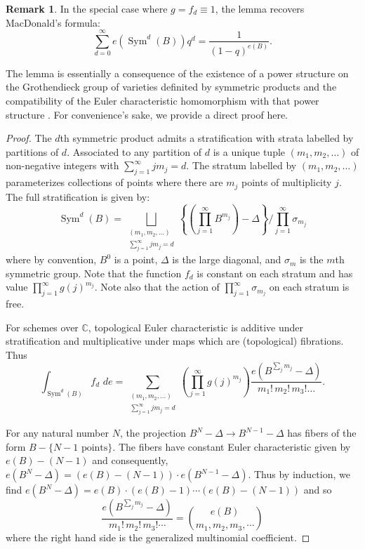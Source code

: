 \documentclass{amsart}
\theoremstyle{definition}
\newtheorem{remark}[theorem]{Remark}
\newcommand{\CC} {\mathbb{C}}          %
\newcommand{\Sym}{\operatorname{Sym}}
\begin{document}
\begin{remark} \label{MacD}
In the special case where $g=f_{d}\equiv  1$, the lemma recovers
MacDonald's formula: $$\sum _{d=0}^{\infty }e (\Sym ^{d} (B)) q^{d} =
\frac{1}{(1-q)^{e (B)}}.$$ 

The lemma is essentially a consequence of the existence of a power
structure on the Grothendieck group of varieties definited by
symmetric products and the compatibility of the Euler characteristic
homomorphism with that power structure  \cite{}. For convenience's
sake, we provide a direct proof here.
\end{remark}
\begin{proof}
The $d$th symmetric product admits a stratification with strata
labelled by partitions of $d$. Associated to any partition of $d$ is a
unique tuple $(m_{1},m_{2},\dots )$ of non-negative integers with
$\sum _{j=1}^{\infty }j m_{j}=d$. The stratum labelled by
$(m_{1},m_{2},\dots )$ parameterizes collections of points where there
are $m_{j}$ points of multiplicity $j$. The full stratification is
given by:
\[
\Sym ^{d} (B) = \bigsqcup_{\begin{smallmatrix} (m_{1},m_{2},\dots )\\
\sum _{j=1}^{\infty }j m_{j}=d  \end{smallmatrix}} \left\{\left(\prod _{j=1}^{\infty }B^{m_{j}} \right) -\Delta  \right\}/ \prod _{j=1}^{\infty }\sigma _{m_{j}} 
\]
where by convention, $B^{0}$ is a point, $\Delta $ is the large
diagonal, and $\sigma _{m}$ is the $m$th symmetric group. Note that
the function $f_{d}$ is constant on each stratum and has value $\prod
_{j=1}^{\infty }g (j)^{m_{j}}$. Note also that the action of $\prod
_{j=1}^{\infty }\sigma _{m_{j}}$ on each stratum is free. 

For schemes over $\CC $, topological Euler characteristic is additive
under stratification and multiplicative under maps which are
(topological) fibrations. Thus
\[
\int _{\Sym ^{d} (B)} f_{d}\,\, de = \sum _{\begin{smallmatrix}(m_{1},m_{2},\dots )\\
\sum _{j=1}^{\infty }j m_{j}=d   \end{smallmatrix}} \left(\prod _{j=1}^{\infty } g (j)^{m_{j}} \right) \frac{e (B^{\sum _{j}m_{j}}-\Delta )}{m_{1}!\, m_{2}!\, m_{3}!\dots }.
\]

For any natural number $N$, the projection $B^{N}-\Delta \to
B^{N-1}-\Delta $ has fibers of the form $B-\{N-1\text{ points}
\}$. The fibers have constant Euler characteristic given by $e (B)-
(N-1)$ and consequently, $e (B^{N}-\Delta )= (e (B)- (N-1))\cdot e
(B^{N-1}-\Delta )$. Thus by induction, we find $e (B^{N}-\Delta ) = e
(B)\cdot (e (B)-1)\cdots (e (B)- (N-1))$ and so 
\[
\frac{e (B^{\sum _{j}m_{j}}-\Delta )}{m_{1}!\,m_{2}!\,m_{3}!\cdots } = \binom{e (B)}{m_{1},m_{2},m_{3},\cdots }
\]
where the right hand side is the generalized multinomial coefficient.


\end{proof}
\end{document}
